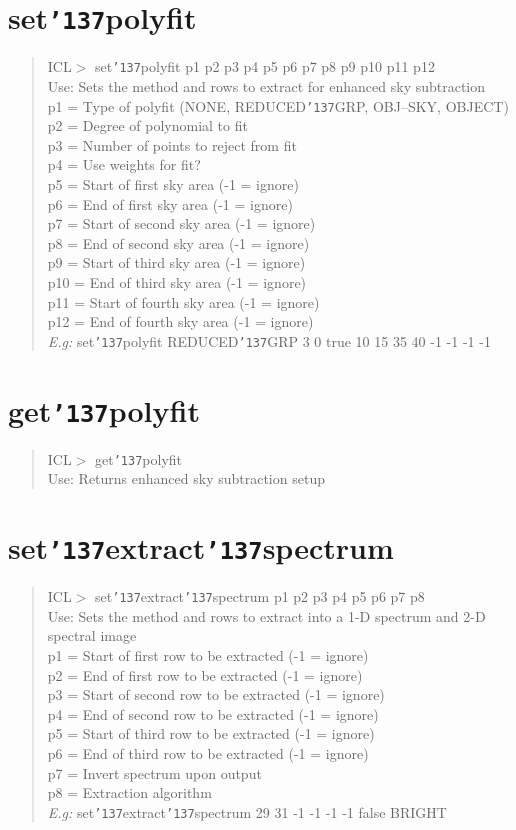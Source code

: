 \documentclass[a4paper]{book}
\renewcommand{\_}{{\tt\char'137}}
\begin{document}
\section{set\_polyfit}
\begin{quote}
ICL$>$ set\_polyfit p1 p2 p3 p4 p5 p6 p7 p8 p9 p10 p11 p12 \\
Use: Sets the method and rows to extract for enhanced sky subtraction \\
p1 = Type of polyfit (NONE, REDUCED\_GRP, OBJ--SKY, OBJECT) \\
p2 = Degree of polynomial to fit \\
p3 = Number of points to reject from fit \\
p4 = Use weights for fit? \\
p5 = Start of first sky area (-1 = ignore) \\
p6 = End of first sky area (-1 = ignore) \\
p7 = Start of second sky area (-1 = ignore) \\
p8 = End of second sky area (-1 = ignore) \\
p9 = Start of third sky area (-1 = ignore) \\
p10 = End of third sky area (-1 = ignore) \\
p11 = Start of fourth sky area (-1 = ignore) \\
p12 = End of fourth sky area (-1 = ignore) \\
{\em E.g:} set\_polyfit REDUCED\_GRP 3 0 {\sc true} 10 15 35 40 -1 -1 -1 -1
\end{quote}
\section{get\_polyfit}
\begin{quote}
ICL$>$ get\_polyfit \\
Use: Returns enhanced sky subtraction setup
\end{quote}

\section{set\_extract\_spectrum}
\begin{quote}
ICL$>$ set\_extract\_spectrum p1 p2 p3 p4 p5 p6 p7 p8 \\
Use: Sets the method and rows to extract into a 1-D spectrum and 2-D spectral image \\
p1 = Start of first row to be extracted (-1 = ignore) \\
p2 = End of first row to be extracted (-1 = ignore) \\
p3 = Start of second row to be extracted (-1 = ignore) \\
p4 = End of second row to be extracted (-1 = ignore) \\
p5 = Start of third row to be extracted (-1 = ignore) \\
p6 = End of third row to be extracted (-1 = ignore) \\
p7 = Invert spectrum upon output \\
p8 = Extraction algorithm \\
{\em E.g:} set\_extract\_spectrum 29 31 -1 -1 -1 -1 {\sc false} BRIGHT
\end{quote}
\end{document}
